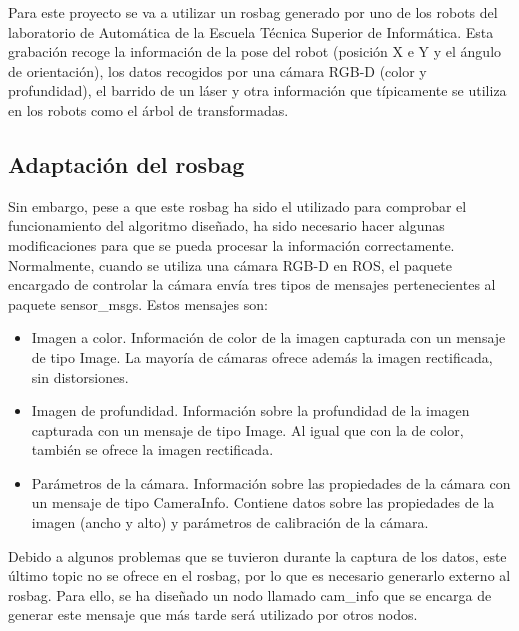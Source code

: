 Para este proyecto se va a utilizar un rosbag generado por uno de los robots del laboratorio de Automática de la Escuela Técnica Superior de Informática. Esta grabación recoge la información de la pose del robot (posición X e Y y el ángulo de orientación), los datos recogidos por una cámara RGB-D (color y profundidad), el barrido de un láser y otra información que típicamente se utiliza en los robots como el árbol de transformadas.\\

\subsection{Adaptación del rosbag}

Sin embargo, pese a que este rosbag ha sido el utilizado para comprobar el funcionamiento del algoritmo diseñado, ha sido necesario hacer algunas modificaciones para que se pueda procesar la información correctamente.\\

Normalmente, cuando se utiliza una cámara RGB-D en ROS, el paquete encargado de controlar la cámara envía tres tipos de mensajes pertenecientes al paquete sensor\_msgs. Estos mensajes son:

\begin{itemize}

	\item Imagen a color. Información de color de la imagen capturada con un mensaje de tipo Image. La mayoría de cámaras ofrece además la imagen rectificada, sin distorsiones.
	\item Imagen de profundidad. Información sobre la profundidad de la imagen capturada con un mensaje de tipo Image. Al igual que con la de color, también se ofrece la imagen rectificada.
	\item Parámetros de la cámara. Información sobre las propiedades de la cámara con un mensaje de tipo CameraInfo. Contiene datos sobre las propiedades de la imagen (ancho y alto) y parámetros de calibración de la cámara.

\end{itemize}

Debido a algunos problemas que se tuvieron durante la captura de los datos, este último topic no se ofrece en el rosbag, por lo que es necesario generarlo externo al rosbag. Para ello, se ha diseñado un nodo llamado cam\_info que se encarga de generar este mensaje que más tarde será utilizado por otros nodos.\\

